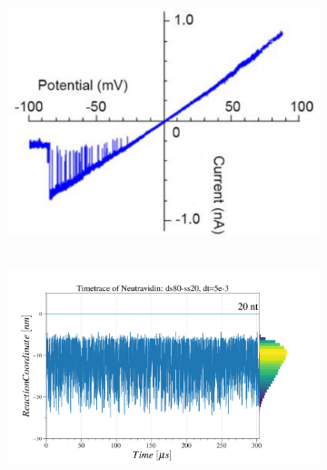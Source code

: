 \begin{figure}[ht]
  \begin{centering}
  \begin{subfigure}[t]{\dimexpr.3\linewidth-1.3em\relax}
  \centering
  \vspace{0.2cm}
  \hbox{\hspace{0.35cm}
  \includegraphics[width=1\linewidth,valign=t]{Figures/IV-80.png}}
  \end{subfigure}%
  \hspace{-0.5cm}
  \begin{subfigure}[t]{\dimexpr.5\linewidth-1.3em\relax}
  \centering
  \hbox{\hspace{0.51cm}
  \includegraphics[width=\linewidth,valign=t]{Figures/MR-80.png}}
  \end{subfigure}%
  \hspace{.5cm}

\end{centering}
\end{figure}
